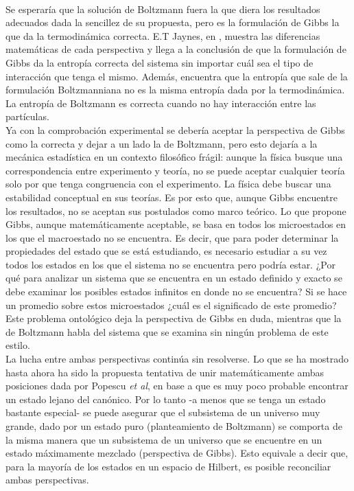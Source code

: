 \\
Se esperaría que la solución de Boltzmann fuera la que diera los resultados adecuados dada la sencillez de su propuesta, pero es la formulación de Gibbs la que da la termodinámica correcta. E.T Jaynes, en \cite{JaynesEntropies}, muestra las diferencias matemáticas de cada perspectiva y llega a la conclusión de que la formulación de Gibbs da la entropía correcta del sistema sin importar cuál sea el tipo de interacción que tenga el mismo. Además, encuentra que la entropía que sale de la formulación Boltzmanniana no es la misma entropía dada por la termodinámica. La entropía de Boltzmann es correcta cuando no hay interacción entre las partículas.
\\
Ya con la comprobación experimental se debería aceptar la perspectiva de Gibbs como la correcta y dejar a un lado la de Boltzmann, pero esto dejaría a la mecánica estadística en un contexto filosófico frágil: aunque la física busque una correspondencia entre experimento y teoría, no se puede aceptar cualquier teoría solo por que tenga congruencia con el experimento. La física debe buscar una estabilidad conceptual en sus teorías. Es por esto que, aunque Gibbs encuentre los resultados, no se aceptan sus postulados como marco teórico. Lo que propone Gibbs, aunque matemáticamente aceptable, se basa en todos los microestados en los que el macroestado no se encuentra. Es decir, que para poder determinar la propiedades del estado que se está estudiando, es necesario estudiar a su vez todos los estados en los que el sistema no se encuentra pero podría estar. ¿Por qué para analizar un sistema que se encuentra en un estado definido y exacto se debe examinar los posibles estados infinitos en donde no se encuentra? Si se hace un promedio sobre estos microestados ¿cuál es el significado de este promedio? Este problema ontológico deja la perspectiva de Gibbs en duda, mientras que la de Boltzmann habla del sistema que se examina sin ningún problema de este estilo. 
\\
La lucha entre ambas perspectivas continúa sin resolverse. Lo que se ha mostrado hasta ahora ha sido la propuesta tentativa de unir matemáticamente ambas posiciones dada por Popescu \textit{et al}, en base a que es muy poco probable encontrar un estado lejano del canónico. Por lo tanto -a menos que se tenga un estado bastante especial- se puede asegurar que el subsistema de un universo muy grande, dado por un estado puro (planteamiento de Boltzmann) se comporta de la misma manera que un subsistema de un universo que se encuentre en un estado máximamente mezclado (perspectiva de Gibbs). Esto equivale a decir que, para la mayoría de los estados en un espacio de Hilbert, es posible reconciliar ambas perspectivas.

